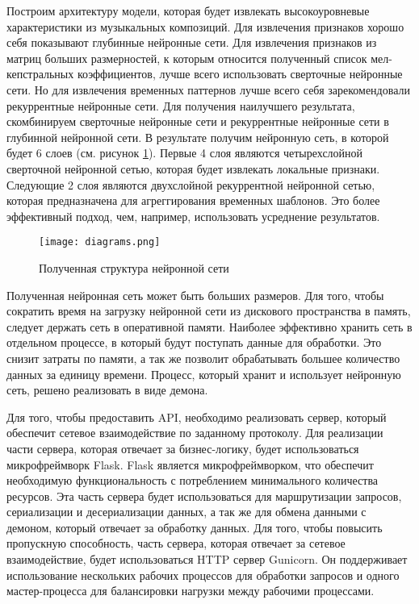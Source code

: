 Построим архитектуру модели, которая будет извлекать высокоуровневые характеристики из музыкальных композиций. Для извлечения признаков хорошо себя показывают глубинные нейронные сети. Для извлечения признаков из матриц больших размерностей, к которым относится полученный список мел-кепстральных коэффициентов, лучше всего использовать сверточные нейронные сети. Но для извлечения временных паттернов лучше всего себя зарекомендовали рекуррентные нейронные сети. Для получения наилучшего результата, скомбинируем сверточные нейронные сети и рекуррентные нейронные сети в глубинной нейронной сети. В результате получим нейронную сеть, в которой будет 6 слоев (см. рисунок \ref{sec:design:dev:neuralnet}). Первые 4 слоя являются четырехслойной сверточной нейронной сетью, которая будет извлекать локальные признаки. Следующие 2 слоя являются двухслойной рекуррентной нейронной сетью, которая предназначена для агреггирования временных шаблонов. Это более эффективный подход, чем, например, использовать усреднение результатов.

\begin{figure}
\centering
	\texttt{[image: diagrams.png]}
	\caption{Полученная структура нейронной сети}
	\label{sec:design:dev:neuralnet}
\end{figure}

Полученная нейронная сеть может быть больших размеров. Для того, чтобы сократить время на загрузку нейронной сети из дискового пространства в память, следует держать сеть в оперативной памяти. Наиболее эффективно хранить сеть в отдельном процессе, в который будут поступать данные для обработки. Это снизит затраты по памяти, а так же позволит обрабатывать большее количество данных за единицу времени. Процесс, который хранит и использует нейронную сеть, решено реализовать в виде демона.

Для того, чтобы предоставить API, необходимо реализовать сервер, который обеспечит сетевое взаимодействие по заданному протоколу. Для реализации части сервера, которая отвечает за бизнес-логику, будет использоваться микрофреймворк Flask. Flask является микрофреймворком, что обеспечит необходимую функциональность с потреблением минимального количества ресурсов. Эта часть сервера будет использоваться для маршрутизации запросов, сериализации и десериализации данных, а так же для обмена данными с демоном, который отвечает за обработку данных. Для того, чтобы повысить пропускную способность, часть сервера, которая отвечает за сетевое взаимодействие, будет использоваться HTTP сервер Gunicorn. Он поддерживает использование нескольких рабочих процессов для обработки запросов и одного мастер-процесса для балансировки нагрузки между рабочими процессами.

